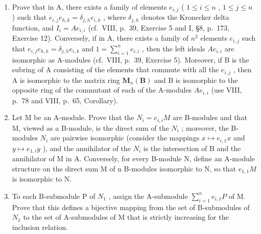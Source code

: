 \begin{enumerate}
\def\labelenumi{\alph{enumi})}
\item
  Prove that in A, there exists a family of elements \(e_{i,j}\) ( \(1 \leqslant i \leqslant n\) , \(1 \leqslant j \leqslant n\) ) such that \(e_{i,j}e_{h,k} = \delta_{j,h}e_{i,k}\) , where \(\delta_{j,h}\) denotes the Kronecker delta function, and \(I_i = Ae_{i,i}\) (cf.~VIII, p.~39, Exercise 5 and I, §8, p.~173, Exercise 12). Conversely, if in A, there exists a family of \(n^2\) elements \(e_{i,j}\) such that \(e_{i,j}e_{h,k} = \delta_{j,h}e_{i,k}\) and \(1 = \sum_{i=1}^{n} e_{i,i}\) , then the left ideals \(Ae_{i,i}\) are isomorphic as A-modules (cf.~VIII, p.~39, Exercise 5). Moreover, if B is the subring of A consisting of the elements that commute with all the \(e_{i,j}\) , then A is isomorphic to the matrix ring \(\mathbf{M}_n(\mathbf{B})\) and B is isomorphic to the opposite ring of the commutant of each of the A-modules \(Ae_{i,i}\) (use VIII, p.~78 and VIII, p.~65, Corollary).
\item
  Let M be an A-module. Prove that the \(N_{i} = e_{i,i}M\) are B-modules and that M, viewed as a B-module, is the direct sum of the \(N_{i}\) ; moreover, the B-modules \(N_{i}\) are pairwise isomorphic (consider the mappings \(x \mapsto e_{i,1}x\) and \(y \mapsto e_{1,i}y\) ), and the annihilator of the \(N_{i}\) is the intersection of B and the annihilator of M in A. Conversely, for every B-module N, define an A-module structure on the direct sum M of n B-modules isomorphic to N, so that \(e_{1,1}M\) is isomorphic to N.
\item
  To each B-submodule P of \(N_{1}\) , assign the A-submodule \(\sum_{i=1}^{n} e_{i,1}P\) of M. Prove that this defines a bijective mapping from the set of B-submodules of \(N_{1}\) to the set of A-submodules of M that is strictly increasing for the inclusion relation.
\end{enumerate}

